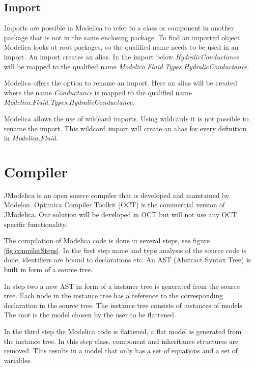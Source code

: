 \documentclass{cslthse-msc}
\begin{document}
\subsection{Import}
Imports are possible in Modelica to refer to a class or component in another package that is not in the same enclosing package. To find an imported object Modelica looks at root packages, so the qualified name needs to be used in an import. An import creates an alias. In the import below \textit{HydralicConductance} will be mapped to the qualified name \textit{Modelica.Fluid.Types.HydralicConductance}.



Modelica offers the option to rename an import. Here an alias will be created where the name \textit{Conductance} is mapped to the qualified name \textit{Modelica.Fluid.Types.HydralicConductance}.



Modelica allows the use of wildcard imports. Using wildcards it is not possible to rename the import. This wildcard import will create an alias for every definition in \textit{Modelica.Fluid}.



\section{Compiler}
JModelica is an open source compiler that is developed and maintained by Modelon. Optimica Compiler Toolkit (OCT) is the commercial version of JModelica. Our solution will be developed in OCT but will not use any OCT specific functionality. 

The compilation of Modelica code is done in several steps, see figure \ref{fig:compilerSteps}. In the first step name and type analysis of the source code is done, identifiers are bound to declarations etc. An AST (Abstract Syntax Tree) is built in form of a source tree.


In step two a new AST in form of a instance tree is generated from the source tree. Each node in the instance tree has a reference to the corresponding declaration in the source tree. The instance tree consists of instances of models. The root is the model chosen by the user to be flattened.

In the third step the Modelica code is flattened, a flat model is generated from the instance tree. In this step class, component and inheritance structures are removed. This results in a model that only has a set of equations and a set of variables.
\end{document}
